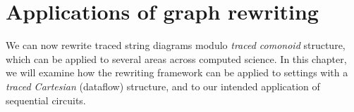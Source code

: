 \chapter{Applications of graph rewriting}\label{chap:graphs-applications}

We can now rewrite traced string diagrams modulo \emph{traced comonoid}
structure, which can be applied to several areas across computed science.
In this chapter, we will examine how the rewriting framework can be applied to
settings with a \emph{traced Cartesian} (dataflow) structure, and to our
intended application of sequential circuits.




